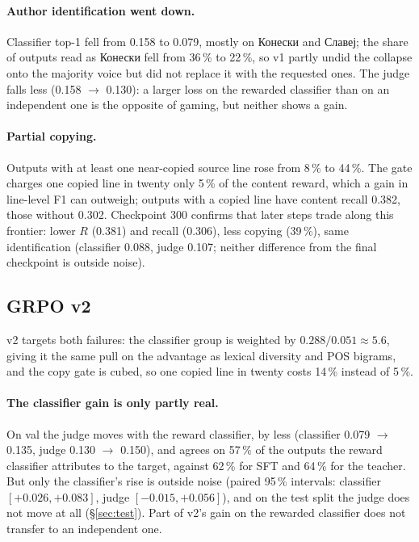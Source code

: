 \documentclass[11pt]{article}
\begin{document}
\paragraph{Author identification went down.} Classifier top-1 fell from 0.158
to 0.079, mostly on Конески and Славеј; the share of outputs read as Конески
fell from 36\,\% to 22\,\%, so v1 partly undid the collapse onto the majority
voice but did not replace it with the requested ones. The judge falls less
(0.158 $\to$ 0.130): a larger loss on the rewarded classifier than on an
independent one is the opposite of gaming, but neither shows a gain.

\paragraph{Partial copying.} Outputs with at least one near-copied source line
rose from 8\,\% to 44\,\%. The gate charges one copied line in twenty only
5\,\% of the content reward, which a gain in line-level F1 can outweigh;
outputs with a copied line have content recall 0.382, those without 0.302.
Checkpoint 300 confirms that later steps trade along this frontier: lower $R$
(0.381) and recall (0.306), less copying (39\,\%), same identification
(classifier 0.088, judge 0.107; neither difference from the final checkpoint
is outside noise).

\subsection{GRPO v2}

v2 targets both failures: the classifier group is weighted by
$0.288/0.051\approx5.6$, giving it the same pull on the advantage as lexical
diversity and POS bigrams, and the copy gate is cubed, so one copied line in
twenty costs 14\,\% instead of 5\,\%.

\paragraph{The classifier gain is only partly real.} On val the judge moves
with the reward classifier, by less (classifier 0.079 $\to$ 0.135, judge 0.130
$\to$ 0.150), and agrees on 57\,\% of the outputs the reward classifier
attributes to the target, against 62\,\% for SFT and 64\,\% for the teacher.
But only the classifier's rise is outside noise (paired 95\,\% intervals:
classifier $[+0.026, +0.083]$, judge $[-0.015, +0.056]$), and on the test split
the judge does not move at all (\S\ref{sec:test}). Part of v2's gain on the
rewarded classifier does not transfer to an independent one.
\end{document}
